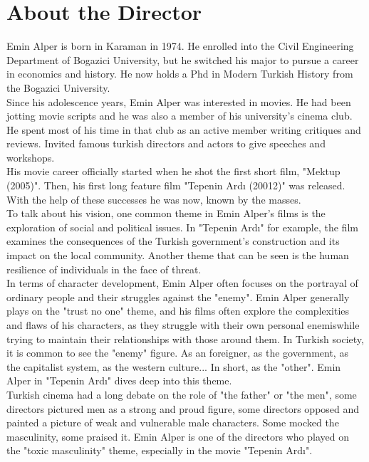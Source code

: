 \documentclass[12pt]{article}
\begin{document}
\section{About the Director}
\par
Emin Alper is born in Karaman in 1974. He enrolled into the Civil Engineering Department of Bogazici University, but he switched his major to pursue a career in economics and history. He now holds a Phd in Modern Turkish History from the Bogazici University.
\\
Since his adolescence years, Emin Alper was interested in movies. He had been jotting movie scripts and he was also a member of his university's cinema club. He spent most of his time in that club as an active member writing critiques and reviews. Invited famous turkish directors and actors to give speeches and workshops.
\\
His movie career officially started when he shot the first short film, "Mektup (2005)". Then, his first long feature film "Tepenin Ardı (20012)" was released. With the help of these successes he was now, known by the masses.
\\
To talk about his vision, one common theme in Emin Alper's films is the exploration of social and political issues. In "Tepenin Ardı" for example, the film examines the consequences of the Turkish government's construction and its impact on the local community. Another theme that can be seen is the human resilience of individuals in the face of threat.
\\
In terms of character development, Emin Alper often focuses on the portrayal of ordinary people and their struggles against the "enemy". Emin Alper generally plays on the "trust no one" theme, and his films often explore the complexities and flaws of his characters, as they struggle with their own personal enemiswhile trying to maintain their relationships with those around them. In Turkish society, it is common to see the "enemy" figure. As an foreigner, as the government, as the capitalist system, as the western culture... In short, as the "other". Emin Alper in "Tepenin Ardı" dives deep into this theme.
\\
Turkish cinema had a long debate on the role of "the father" or "the men", some directors pictured men as a strong and proud figure, some directors opposed and painted a picture of weak and vulnerable male characters. Some mocked the masculinity, some praised it. Emin Alper is one of the directors who played on the "toxic masculinity" theme, especially in the movie "Tepenin Ardı".
\end{document}
